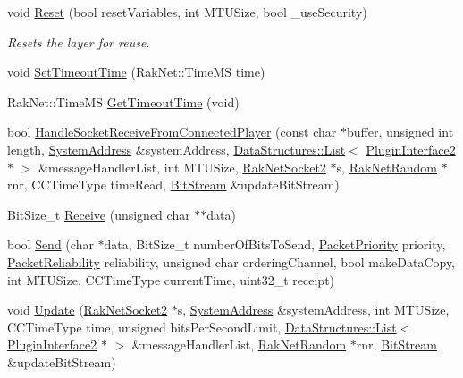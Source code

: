 \begin{DoxyCompactItemize}
\item 
\hypertarget{class_rak_net_1_1_reliability_layer_ae9130c179782a6f8c27cd9c1385818dc}{void \hyperlink{class_rak_net_1_1_reliability_layer_ae9130c179782a6f8c27cd9c1385818dc}{Reset} (bool reset\-Variables, int M\-T\-U\-Size, bool \-\_\-use\-Security)}\label{class_rak_net_1_1_reliability_layer_ae9130c179782a6f8c27cd9c1385818dc}

\begin{DoxyCompactList}\small\item\em Resets the layer for reuse. \end{DoxyCompactList}\item 
void \hyperlink{class_rak_net_1_1_reliability_layer_a52cf9a398cfe611e1af920a19e65787a}{Set\-Timeout\-Time} (Rak\-Net\-::\-Time\-M\-S time)
\item 
Rak\-Net\-::\-Time\-M\-S \hyperlink{class_rak_net_1_1_reliability_layer_a36dcac9c07138222392a4c1314c23a8f}{Get\-Timeout\-Time} (void)
\item 
bool \hyperlink{class_rak_net_1_1_reliability_layer_ad4705443cbdb957b9351cfffdd23a81b}{Handle\-Socket\-Receive\-From\-Connected\-Player} (const char $\ast$buffer, unsigned int length, \hyperlink{struct_rak_net_1_1_system_address}{System\-Address} \&system\-Address, \hyperlink{class_data_structures_1_1_list}{Data\-Structures\-::\-List}$<$ \hyperlink{class_rak_net_1_1_plugin_interface2}{Plugin\-Interface2} $\ast$ $>$ \&message\-Handler\-List, int M\-T\-U\-Size, \hyperlink{class_rak_net_1_1_rak_net_socket2}{Rak\-Net\-Socket2} $\ast$s, \hyperlink{class_rak_net_1_1_rak_net_random}{Rak\-Net\-Random} $\ast$rnr, C\-C\-Time\-Type time\-Read, \hyperlink{class_rak_net_1_1_bit_stream}{Bit\-Stream} \&update\-Bit\-Stream)
\item 
Bit\-Size\-\_\-t \hyperlink{class_rak_net_1_1_reliability_layer_a9dcac79ba7f4f69424c586f267dbf0a1}{Receive} (unsigned char $\ast$$\ast$data)
\item 
bool \hyperlink{class_rak_net_1_1_reliability_layer_a1c0cec3e2e22dc8a5e66906f659e226a}{Send} (char $\ast$data, Bit\-Size\-\_\-t number\-Of\-Bits\-To\-Send, \hyperlink{_packet_priority_8h_a659378374e516180f93640c79f59705c}{Packet\-Priority} priority, \hyperlink{_packet_priority_8h_ae41fa01235e99dced384d137fa874a7e}{Packet\-Reliability} reliability, unsigned char ordering\-Channel, bool make\-Data\-Copy, int M\-T\-U\-Size, C\-C\-Time\-Type current\-Time, uint32\-\_\-t receipt)
\item 
void \hyperlink{class_rak_net_1_1_reliability_layer_ab49b383b349560bbb4f72643db3e1ea0}{Update} (\hyperlink{class_rak_net_1_1_rak_net_socket2}{Rak\-Net\-Socket2} $\ast$s, \hyperlink{struct_rak_net_1_1_system_address}{System\-Address} \&system\-Address, int M\-T\-U\-Size, C\-C\-Time\-Type time, unsigned bits\-Per\-Second\-Limit, \hyperlink{class_data_structures_1_1_list}{Data\-Structures\-::\-List}$<$ \hyperlink{class_rak_net_1_1_plugin_interface2}{Plugin\-Interface2} $\ast$ $>$ \&message\-Handler\-List, \hyperlink{class_rak_net_1_1_rak_net_random}{Rak\-Net\-Random} $\ast$rnr, \hyperlink{class_rak_net_1_1_bit_stream}{Bit\-Stream} \&update\-Bit\-Stream)
$$
\end{DoxyCompactItemize}

